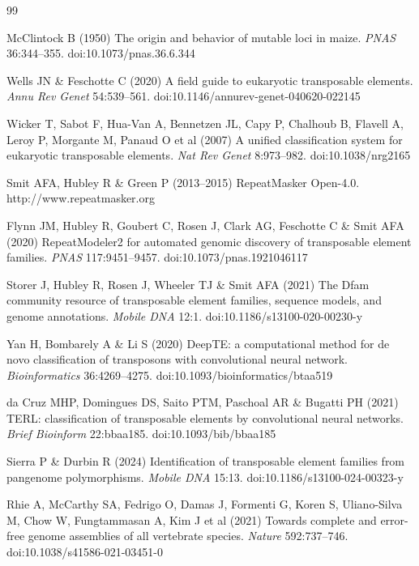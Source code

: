 \documentclass[12pt]{article}
\begin{document}
\begin{singlespacing}
\begin{thebibliography}{99}

McClintock B (1950) The origin and behavior of mutable loci in maize. \textit{PNAS} 36:344--355. doi:10.1073/pnas.36.6.344

Wells JN \& Feschotte C (2020) A field guide to eukaryotic transposable elements. \textit{Annu Rev Genet} 54:539--561. doi:10.1146/annurev-genet-040620-022145

Wicker T, Sabot F, Hua-Van A, Bennetzen JL, Capy P, Chalhoub B, Flavell A, Leroy P, Morgante M, Panaud O et al (2007) A unified classification system for eukaryotic transposable elements. \textit{Nat Rev Genet} 8:973--982. doi:10.1038/nrg2165

Smit AFA, Hubley R \& Green P (2013--2015) RepeatMasker Open-4.0. http://www.repeatmasker.org

Flynn JM, Hubley R, Goubert C, Rosen J, Clark AG, Feschotte C \& Smit AFA (2020) RepeatModeler2 for automated genomic discovery of transposable element families. \textit{PNAS} 117:9451--9457. doi:10.1073/pnas.1921046117

Storer J, Hubley R, Rosen J, Wheeler TJ \& Smit AFA (2021) The Dfam community resource of transposable element families, sequence models, and genome annotations. \textit{Mobile DNA} 12:1. doi:10.1186/s13100-020-00230-y

Yan H, Bombarely A \& Li S (2020) DeepTE: a computational method for de novo classification of transposons with convolutional neural network. \textit{Bioinformatics} 36:4269--4275. doi:10.1093/bioinformatics/btaa519

da Cruz MHP, Domingues DS, Saito PTM, Paschoal AR \& Bugatti PH (2021) TERL: classification of transposable elements by convolutional neural networks. \textit{Brief Bioinform} 22:bbaa185. doi:10.1093/bib/bbaa185

Sierra P \& Durbin R (2024) Identification of transposable element families from pangenome polymorphisms. \textit{Mobile DNA} 15:13. doi:10.1186/s13100-024-00323-y

Rhie A, McCarthy SA, Fedrigo O, Damas J, Formenti G, Koren S, Uliano-Silva M, Chow W, Fungtammasan A, Kim J et al (2021) Towards complete and error-free genome assemblies of all vertebrate species. \textit{Nature} 592:737--746. doi:10.1038/s41586-021-03451-0


\end{thebibliography}
\end{singlespacing}
\end{document}
